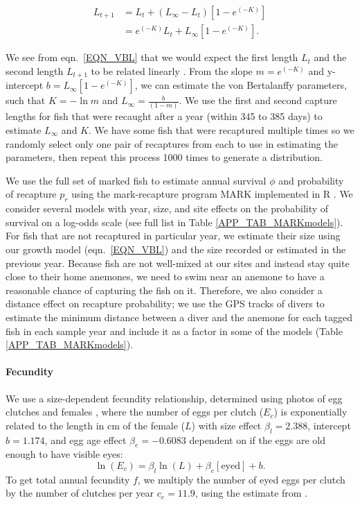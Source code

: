 \documentclass[12pt, oneside]{article}   	%
\begin{document}
\begin{equation} \label{EQN_VBL} 
\begin{split}
L_{t+1} & = L_t + (L_\infty - L_t)[1 - e^{(-K)}] \\
 & = e^{(-K)}L_t + L_\infty[1 - e^{(-K)}].
\end{split}
\end{equation}

We see from eqn.\ \ref{EQN_VBL} that we would expect the first length $L_t$ and the second length $L_{t+1}$ to be related linearly \citep{hart2009estimating}. From the slope $m = e^{(-K)}$ and y-intercept $b =  L_\infty[1 - e^{(-K)}]$, we can estimate the von Bertalanffy parameters, such that $K = -\ln m$ and $L_\infty = \frac{b}{(1-m)}$. We use the first and second capture lengths for fish that were recaught after a year (within 345 to 385 days) to estimate $L_\infty$ and $K$. We have some fish that were recaptured multiple times so we randomly select only one pair of recaptures from each to use in estimating the parameters, then repeat this process 1000 times to generate a distribution. 

We use the full set of marked fish to estimate annual survival $\phi$ and probability of recapture $p_r$ using the mark-recapture program MARK implemented in R \citep{RMark_Laake2013}. We consider several models with year, size, and site effects on the probability of survival on a log-odds scale (see full list in Table \ref{APP_TAB_MARKmodels}). For fish that are not recaptured in particular year, we estimate their size using our growth model (eqn.\ \ref{EQN_VBL}) and the size recorded or estimated in the previous year. Because fish are not well-mixed at our sites and instead stay quite close to their home anemones, we need to swim near an anemone to have a reasonable chance of capturing the fish on it. Therefore, we also consider a distance effect on recapture probability; we use the GPS tracks of divers to estimate the minimum distance between a diver and the anemone for each tagged fish in each sample year and include it as a factor in some of the models (Table \ref{APP_TAB_MARKmodels}). 

\paragraph*{Fecundity}

We use a size-dependent fecundity relationship, determined using photos of egg clutches and females \citep{yawdoszynInPrepfecundity}, where the number of eggs per clutch ($E_c$) is exponentially related to the length in cm of the female ($L$) with size effect $\beta_l = 2.388$, intercept $b = 1.174$, and egg age effect $\beta_e = -0.6083$ dependent on if the eggs are old enough to have visible eyes: 
\begin{equation} %
\ln(E_c) = \beta_l\ln(L) + \beta_e[\text{eyed}] + b. \label{EQN_Fec}
\end{equation}
To get total annual fecundity $f$, we multiply the number of eyed eggs per clutch by the number of clutches per year $c_e = 11.9$, using the estimate from \cite{holtswarth2017fecundity}.
\end{document}

